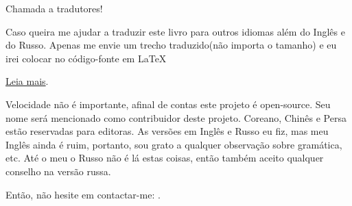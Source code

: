 \vspace*{\fill}

\Huge Chamada a tradutores!

\normalsize

\bigskip
\bigskip
\bigskip

Caso queira me ajudar a traduzir este livro para outros idiomas além do Inglês e do Russo.
Apenas me envie um trecho traduzido(não importa o tamanho) e eu irei colocar no código-fonte em LaTeX

\href{https://github.com/dennis714/RE-for-beginners/blob/master/Translation.md}{Leia mais}.

Velocidade não é importante, afinal de contas este projeto é open-source.
Seu nome será mencionado como contribuidor deste projeto.
Coreano, Chinês e Persa estão reservadas para editoras.
As versões em Inglês e Russo eu fiz, mas meu Inglês ainda é ruim, portanto, sou grato a qualquer observação sobre gramática, etc.
Até o meu o Russo não é lá estas coisas, então também aceito qualquer conselho na versão russa.%

Então, não hesite em contactar-me: \GTT{\EMAIL}.

\vspace*{\fill}
\vfill
